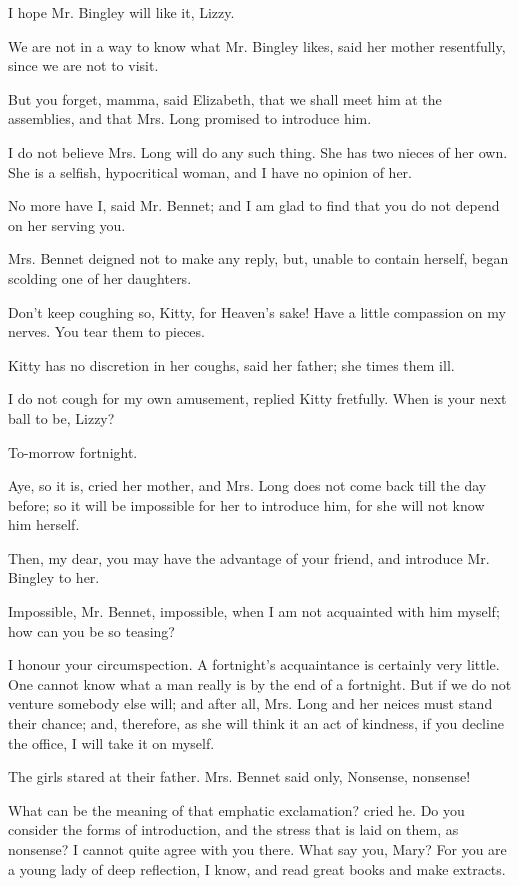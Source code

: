 \documentclass[twocolumn,DIV=7]{scrartcl}
\begin{document}
I hope Mr. Bingley will like it, Lizzy.

We are not in a way to know what Mr. Bingley likes, said her mother
resentfully, since we are not to visit.

But you forget, mamma, said Elizabeth, that we shall meet him at the
assemblies, and that Mrs. Long promised to introduce him.

I do not believe Mrs. Long will do any such thing. She has two nieces
of her own. She is a selfish, hypocritical woman, and I have no opinion
of her.

No more have I, said Mr. Bennet; and I am glad to find that you do
not depend on her serving you.

Mrs. Bennet deigned not to make any reply, but, unable to contain
herself, began scolding one of her daughters.

Don't keep coughing so, Kitty, for Heaven's sake! Have a little
compassion on my nerves. You tear them to pieces.

Kitty has no discretion in her coughs, said her father; she times
them ill.

I do not cough for my own amusement, replied Kitty fretfully. When is
your next ball to be, Lizzy?

To-morrow fortnight.

Aye, so it is, cried her mother, and Mrs. Long does not come back
till the day before; so it will be impossible for her to introduce him,
for she will not know him herself.

Then, my dear, you may have the advantage of your friend, and introduce
Mr. Bingley to her.

Impossible, Mr. Bennet, impossible, when I am not acquainted with him
myself; how can you be so teasing?

I honour your circumspection. A fortnight's acquaintance is certainly
very little. One cannot know what a man really is by the end of a
fortnight. But if we do not venture somebody else will; and after all,
Mrs. Long and her neices must stand their chance; and, therefore, as
she will think it an act of kindness, if you decline the office, I will
take it on myself.

The girls stared at their father. Mrs. Bennet said only, Nonsense,
nonsense!

What can be the meaning of that emphatic exclamation? cried he. Do
you consider the forms of introduction, and the stress that is laid on
them, as nonsense? I cannot quite agree with you there. What say you,
Mary? For you are a young lady of deep reflection, I know, and read
great books and make extracts.
\end{document}
